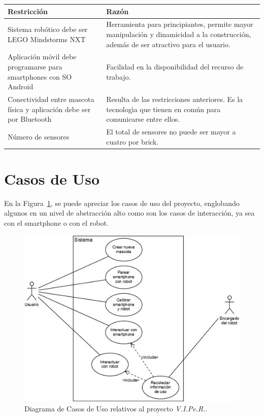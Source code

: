 \documentclass[letterpaper,12pt]{article} %
\numberwithin{equation}{section} %
\numberwithin{figure}{section} %
\numberwithin{table}{section} %
\begin{document}
\begin{table}[H]
  \centering
  \begin{tabular}{p{5cm}p{9cm}}\hline
    Restricci\'on & Raz\'on \\ \hline\hline %
    Sistema rob\'otico debe ser LEGO Mindstorms NXT & Herramienta para principiantes, permite mayor manipulaci\'on y dinamicidad a la construcci\'on, adem\'as de ser atractivo para el usuario.\\ \hline
    Aplicaci\'on m\'ovil debe programarse para smartphones con SO Android & Facilidad en la disponibilidad del recurso de trabajo. \\ \hline
    Conectividad entre mascota f\'isica y aplicaci\'on debe ser por Bluetooth & Resulta de las restricciones anteriores. Es la tecnolog\'{\i}a que tienen en com\'un para comunicarse entre ellos.\\ \hline
    N\'umero de sensores & El total de sensores no puede ser mayor a cuatro por brick.\\\hline \hline
  \end{tabular}
\end{table}

\newpage
\section{Casos de Uso} %

En la Figura~\ref{fig:CasoUso}, se puede apreciar los casos de uso del proyecto, englobando algunos en un nivel de abstracci\'on alto como son los casos de interacci\'on, ya sea con el smartphone o con el robot.\\

\begin{figure}[H]
   \centering
     \includegraphics[scale=1]{CasoUso.jpg}
   \caption{Diagrama de Casos de Uso relativos al proyecto \emph{V.I.Pe.R.}.}
   \label{fig:CasoUso}
\end{figure}
\end{document}
